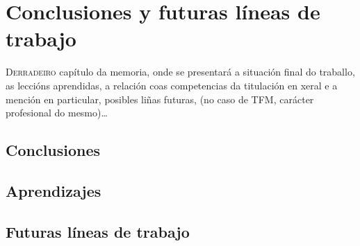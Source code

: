 \chapter{Conclusiones y futuras líneas de trabajo}
\label{chap:conclusions}

\lettrine{D}{erradeiro} capítulo da memoria, onde se presentará a
situación final do traballo, as leccións aprendidas, a relación coas
competencias da titulación en xeral e a mención en particular,
posibles liñas futuras, (no caso de TFM, carácter profesional do mesmo)\dots

\section{Conclusiones}
\label{sec:conclusions}

\section{Aprendizajes}
\label{sec:aprendizajes}

\section{Futuras líneas de trabajo}
\label{sec:futuro}